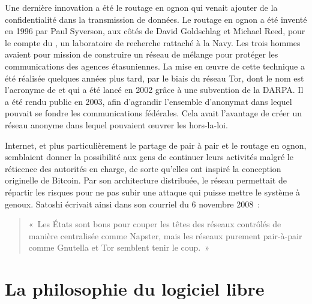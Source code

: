 Une dernière innovation a été le routage en ognon qui venait ajouter de la confidentialité dans la transmission de données. Le routage en ognon a été inventé en 1996 par Paul Syverson, aux côtés de David Goldschlag et Michael Reed, pour le compte du , un laboratoire de recherche rattaché à la Navy. Les trois hommes avaient pour mission de construire un réseau de mélange pour protéger les communications des agences étasuniennes. La mise en œuvre de cette technique a été réalisée quelques années plus tard, par le biais du réseau Tor, dont le nom est l'acronyme de  et qui a été lancé en 2002 grâce à une subvention de la DARPA. Il a été rendu public en 2003, afin d'agrandir l'ensemble d'anonymat dans lequel pouvait se fondre les communications fédérales. Cela avait l'avantage de créer un réseau anonyme dans lequel pouvaient œuvrer les hors-la-loi.

Internet, et plus particulièrement le partage de pair à pair et le routage en ognon, semblaient donner la possibilité aux gens de continuer leurs activités malgré le réticence des autorités en charge, de sorte qu'elles ont inspiré la conception originelle de Bitcoin. Par son architecture distribuée, le réseau permettait de répartir les risques pour ne pas subir une attaque qui puisse mettre le système à genoux. Satoshi écrivait ainsi dans son courriel du 6 novembre 2008~:

\begin{quote}
«~Les États sont bons pour couper les têtes des réseaux contrôlés de manière centralisée comme Napster, mais les réseaux purement pair-à-pair comme Gnutella et Tor semblent tenir le coup.~»
\end{quote} %


\section*{La philosophie du logiciel libre} %

